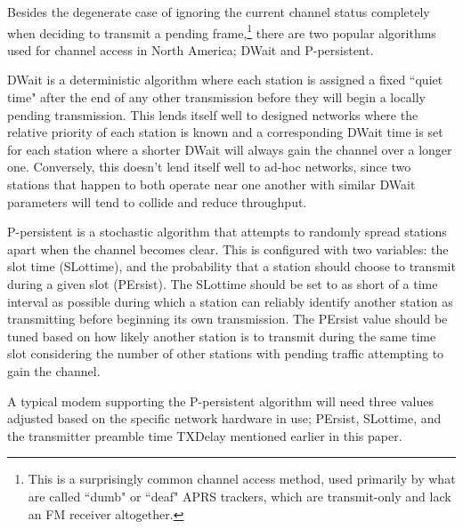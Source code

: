Besides the degenerate case of ignoring the current channel status completely when 
deciding to transmit a pending frame,\footnote{This is a surprisingly
	common channel access method, used primarily by what are called ``dumb" or
	``deaf" APRS trackers, which are transmit-only and lack an
FM receiver altogether.}
there are two popular algorithms used for
channel access in North America;
DWait and P-persistent.

DWait is a deterministic algorithm where each station is assigned a fixed
``quiet time" after the end of any other transmission 
before they will begin a locally pending transmission. 
This lends itself well to designed networks
where the relative priority of each station is known and a corresponding DWait time
is set for each station where a shorter DWait will 
always gain the channel over a longer one. 
Conversely, this doesn't lend itself well to ad-hoc networks,
since two stations that happen to both operate near one another 
with similar DWait parameters
will tend to collide and reduce throughput.

P-persistent is a stochastic algorithm that attempts to randomly spread
stations apart when the channel becomes clear. 
This is configured with two variables: the slot time (SLottime), and the
probability that a station should choose to transmit during a given slot (PErsist). 
The SLottime
should be set to as short of a time interval as possible during which a station can
reliably identify another station as transmitting 
before beginning its own transmission.
The PErsist value should be tuned based on how likely another station is to transmit 
during the same time slot considering the number of other stations with 
pending traffic attempting to gain the channel.

A typical modem supporting the P-persistent algorithm will need three values adjusted
based on the specific network hardware in use; PErsist, SLottime, and the 
transmitter preamble time TXDelay mentioned earlier in this paper.

